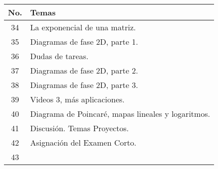 \begin{table}[H]
	\centering
	\begin{tabular}{||c|p{13cm}||}
		\hline
		\hline
			No. & Temas \\
		\hline
		\hline
			34 & La exponencial de una matriz. \\
			35 & Diagramas de fase 2D, parte 1. \\
			36 & Dudas de tareas. \\
			37 & Diagramas de fase 2D, parte 2. \\
			38 & Diagramas de fase 2D, parte 3. \\
			39 & Videos 3, más aplicaciones. \\
			40 & Diagrama de Poincaré, mapas lineales y logaritmos. \\
			41 & Discusión. Temas Proyectos. \\
			42 & Asignación del Examen Corto. \\
			43 &  \\
		\hline
		\hline
	\end{tabular}
\end{table}





